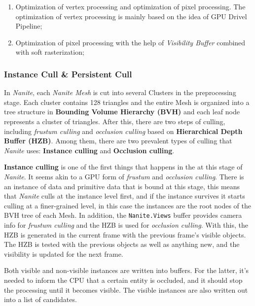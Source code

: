 \documentclass[10pt,journal,compsoc]{IEEEtran}
\begin{document}
\begin{enumerate}
    \item Optimization of vertex processing and optimization of pixel processing. The optimization of vertex processing is mainly based on the idea of GPU Drivel Pipeline; 
    \item Optimization of pixel processing with the help of \textit{Visibility Buffer} combined with soft rasterization;
\end{enumerate}


\subsubsection{Instance Cull \& Persistent Cull}

\par In \textit{Nanite}, each \textit{Nanite Mesh} is cut into several Clusters in the preprocessing stage. Each cluster contains 128 triangles and the entire Mesh is organized into a tree structure in \textbf{Bounding Volume Hierarchy (BVH)} and each leaf node represents a cluster of triangles. After this, there are two steps of culling, including \textit{frustum culling} and \textit{occlusion culling} based on \textbf{Hierarchical Depth Buffer (HZB)}. Among them, there are two prevalent types of culling that \textit{Nanite} uses: \textbf{Instance culling} and \textbf{Occlusion culling}.

\par \textbf{Instance culling} is one of the first things that happens in the at this stage of \textit{Nanite}. It seems akin to a GPU form of \textit{frustum} and \textit{occlusion culling}. There is an instance of data and primitive data that is bound at this stage, this means that \textit{Nanite} culls at the instance level first, and if the instance survives it starts culling at a finer-grained level, in this case the instances are the root nodes of the BVH tree of each Mesh. In addition, the \texttt{Nanite.Views} buffer provides camera info for \textit{frustum culling} and the HZB is used for \textit{occlusion culling}. With this, the HZB is generated in the current frame with the previous frame's visible objects\cite{karies_stubbe_wihlidal_0}. The HZB is tested with the previous objects as well as anything new, and the visibility is updated for the next frame.

\par Both visible and non-visible instances are written into buffers. For the latter, it's needed to inform the CPU that a certain entity is occluded, and it should stop the processing until it becomes visible. The visible instances are also written out into a list of candidates.
\end{document}
